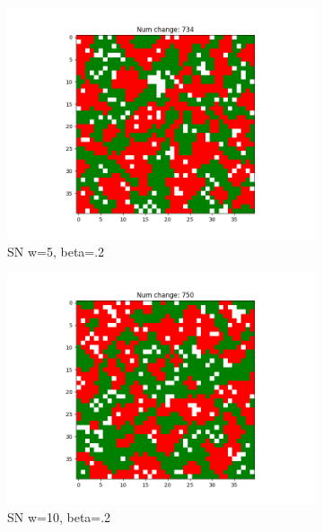 \documentclass[11pt]{article}
\begin{document}
\begin{figure}[h]
\begin{subfigure}{0.14\textwidth}
			\includegraphics[width=\linewidth]{final_cluster_w5b20.png}
			\caption{\centering SN w=5, beta=.2}
			\label{sn_finalw5b20}
		\end{subfigure}\hfill
		\begin{subfigure}{0.14\textwidth}
			\includegraphics[width=\linewidth]{final_cluster_w10b20.png}
			\caption{\centering SN w=10, beta=.2}
			\label{sn_finalw10b20}
		\end{subfigure}\hfill
		\begin{subfigure}{0.14\textwidth}

\end{subfigure}
\end{figure}
\end{document}
